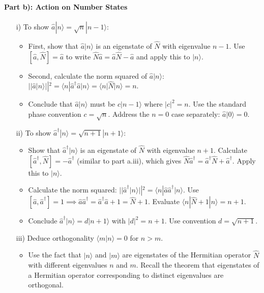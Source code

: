 \documentclass[10pt]{article}
\begin{document}
\paragraph{Part b): Action on Number States}
\begin{enumerate}
    \item[i)] To show \(\hat{a}|n\rangle=\sqrt{n}|n-1\rangle\):
        \begin{itemize}
            \item First, show that \(\hat{a}|n\rangle\) is an eigenstate of \(\hat{N}\) with eigenvalue \(n-1\). Use \([\hat{a}, \hat{N}]=\hat{a}\) to write \(\hat{N}\hat{a} = \hat{a}\hat{N} - \hat{a}\) and apply this to \(|n\rangle\).
            \item Second, calculate the norm squared of \(\hat{a}|n\rangle\): \(||\hat{a}|n\rangle||^2 = \langle n | \hat{a}^\dagger \hat{a} | n \rangle = \langle n | \hat{N} | n \rangle = n\).
            \item Conclude that \(\hat{a}|n\rangle\) must be \(c|n-1\rangle\) where \(|c|^2=n\). Use the standard phase convention \(c=\sqrt{n}\). Address the \(n=0\) case separately: \(\hat{a}|0\rangle = 0\).
        \end{itemize}
    \item[ii)] To show \(\hat{a}^\dagger|n\rangle=\sqrt{n+1}|n+1\rangle\):
        \begin{itemize}
            \item Show that \(\hat{a}^\dagger|n\rangle\) is an eigenstate of \(\hat{N}\) with eigenvalue \(n+1\). Calculate \([\hat{a}^\dagger, \hat{N}] = -\hat{a}^\dagger\) (similar to part a.iii), which gives \(\hat{N}\hat{a}^\dagger = \hat{a}^\dagger\hat{N} + \hat{a}^\dagger\). Apply this to \(|n\rangle\).
            \item Calculate the norm squared: \(||\hat{a}^\dagger|n\rangle||^2 = \langle n | \hat{a} \hat{a}^\dagger | n \rangle\). Use \([\hat{a}, \hat{a}^\dagger]=1 \implies \hat{a}\hat{a}^\dagger = \hat{a}^\dagger\hat{a} + 1 = \hat{N} + 1\). Evaluate \(\langle n|\hat{N}+1|n\rangle = n+1\).
            \item Conclude \(\hat{a}^\dagger|n\rangle = d|n+1\rangle\) with \(|d|^2 = n+1\). Use convention \(d=\sqrt{n+1}\).
        \end{itemize}
    \item[iii)] Deduce orthogonality \(\langle m | n \rangle = 0\) for \(n > m\).
        \begin{itemize}
            \item Use the fact that \(|n\rangle\) and \(|m\rangle\) are eigenstates of the Hermitian operator \(\hat{N}\) with different eigenvalues \(n\) and \(m\). Recall the theorem that eigenstates of a Hermitian operator corresponding to distinct eigenvalues are orthogonal.

\end{itemize}
\end{enumerate}
\end{document}
